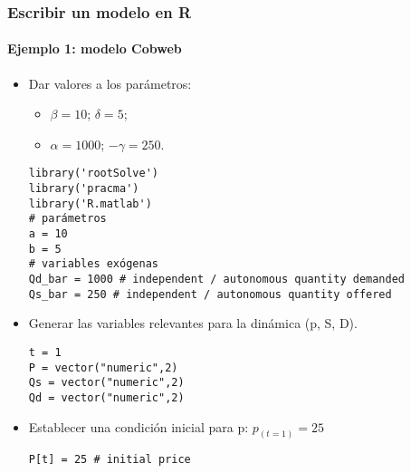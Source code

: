 \documentclass[11pt]{beamer}
\begin{document}
\begin{frame}[fragile]
	\frametitle{Escribir un modelo en R}
	\framesubtitle{Ejemplo 1: modelo Cobweb}
\begin{itemize}
	\item Dar valores a los parámetros:
	\begin{itemize}
		\item $\beta=10$; \hspace{0.55cm} $\delta=5$;
		\item $\alpha=1000$; $-\gamma=250$.
	\end{itemize}
 \begin{verbatim} 
library('rootSolve')
library('pracma')
library('R.matlab')
# parámetros
a = 10
b = 5
# variables exógenas
Qd_bar = 1000 # independent / autonomous quantity demanded
Qs_bar = 250 # independent / autonomous quantity offered     
 \end{verbatim}
	\item Generar las variables relevantes para la dinámica (p, S, D).
 \begin{verbatim} 
t = 1
P = vector("numeric",2)
Qs = vector("numeric",2)
Qd = vector("numeric",2)
\end{verbatim}
 \item Establecer una condición inicial para p: $p_{(t=1)}=25$
 \begin{verbatim} 
P[t] = 25 # initial price
\end{verbatim}
\end{itemize}
\end{frame}
\end{document}
